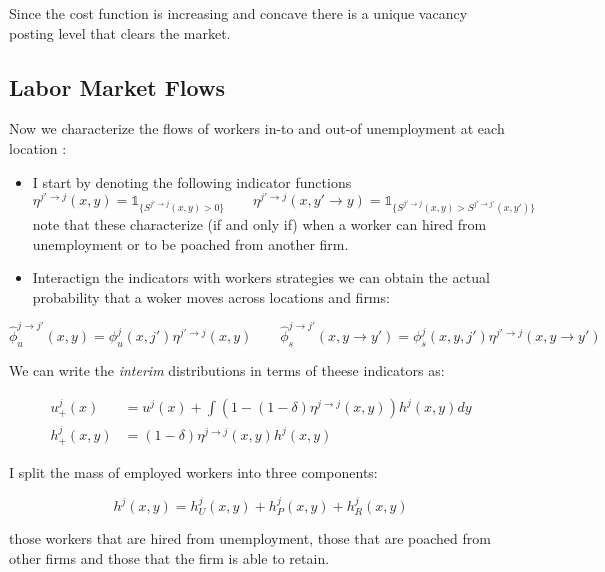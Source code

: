 \documentclass[
  letterpaper,
  DIV=11,
  numbers=noendperiod]{scrartcl}
\begin{document}
Since the cost function is increasing and concave there is a unique
vacancy posting level that clears the market.

\hypertarget{labor-market-flows}{%
\subsection{Labor Market Flows}\label{labor-market-flows}}

Now we characterize the flows of workers in-to and out-of unemployment
at each location :

\begin{itemize}
\item
  I start by denoting the following indicator functions
  \[\eta^{j' \to j}(x,y) = \mathbb{1}_{\{S^{j' \to j}(x,y)>0\}} \qquad \eta^{j' \to j}(x,y'\to y) = \mathbb{1}_{\{S^{j' \to j}(x,y) > S^{j' \to j'}(x,y')\}}\]
  note that these characterize (if and only if) when a worker can hired
  from unemployment or to be poached from another firm.
\item
  Interactign the indicators with workers strategies we can obtain the
  actual probability that a woker moves across locations and firms:
\end{itemize}

\begin{equation}
\hat{\phi}^{j\to j'}_{u}(x,y) = \phi^{j}_{u}(x,j')\eta^{j' \to j}(x,y) \qquad \hat{\phi}^{j \to j'}_{s}(x,y\to y') = \phi^{j}_{s}(x,y,j')\eta^{j' \to j}(x,y\to y')
\end{equation}

We can write the \emph{interim} distributions in terms of theese
indicators as:

\begin{align}
u^{j}_{+}(x) &= u^j(x) + \int\left(1 - (1 - \delta)\eta^{j\to j}(x,y) \right)h^j(x,y)dy \label{eq-interim-u} \\
h_{+}^{j}(x,y) &= (1-\delta)\eta^{j \to j}(x,y)h^j(x,y) \label{eq-interim-h}
\end{align}

I split the mass of employed workers into three components:

\begin{equation}
\label{eq-law-of-motion-emp}
h^j(x,y) =  h^j_{U}(x,y) + h^j_{P}(x,y) + h^j_{R}(x,y) 
\end{equation}

those workers that are hired from unemployment, those that are poached
from other firms and those that the firm is able to retain.
\end{document}
